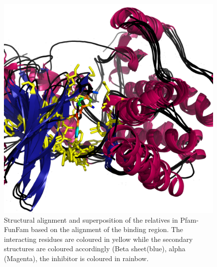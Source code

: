 \documentclass[a4paper, 11pt]{article}
\begin{document}
\begin{figure}[H]
	\includegraphics[width=.8\linewidth]{figures/superpose_4use.png}
	\centering
	\caption{Structural alignment and superposition of the relatives in Pfam-FunFam based on the alignment of the binding region. The interacting residues are coloured in yellow while the secondary structures are coloured accordingly (Beta sheet(blue), alpha (Magenta), the inhibitor is coloured in rainbow.}
	\label{struct_align}
\end{figure}
\end{document}

